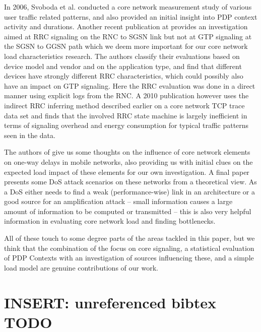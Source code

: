 In 2006, Svoboda et al. \cite{svoboda2006composition} conducted a core network measurement study of various user traffic related patterns, and also provided an initial insight into \ac{PDP} context activity and durations. Another recent publication at \cite{he2012panoramic} provides an investigation aimed at \ac{RRC} signaling on the \ac{RNC} to \ac{SGSN} link but not at \ac{GTP} signaling at the \ac{SGSN} to \ac{GGSN} path which we deem more important for our core network load characteristics research. The authors classify their evaluations based on device model and vendor and on the application type, and find that different devices have strongly different \ac{RRC} characteristics, which could possibly also have an impact on \ac{GTP} signaling. Here the \ac{RRC} evaluation was done in a direct manner using explicit logs from the \ac{RNC}. A 2010 publication\cite{Qian:2010:CRR:1879141.1879159} however uses the indirect \ac{RRC} inferring method described earlier on a core network TCP trace data set and finds that the involved \ac{RRC} state machine is largely inefficient in terms of signaling overhead and energy consumption for typical traffic patterns seen in the data.

The authors of \cite{4675847} give us some thoughts on the influence of core network elements on one-way delays in mobile networks, also providing us with initial clues on the expected load impact of these elements for our own investigation. A final paper \cite{Ricciato2010551} presents some \ac{DoS} attack scenarios on these networks from a theoretical view. As a \ac{DoS} either needs to find a weak (performance-wise) link in an architecture or a good source for an amplification attack -- small information causes a large amount of information to be computed or transmitted -- this is also very helpful information in evaluating core network load and finding bottlenecks.

All of these touch to some degree parts of the areas tackled in this paper, but we think that the combination of the focus on core signaling, a statistical evaluation of PDP Contexts with an investigation of sources influencing these, and a simple load model are genuine contributions of our work.



\section{INSERT: unreferenced bibtex TODO}

